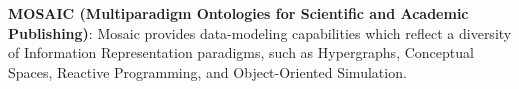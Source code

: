 \begin{frame}{}
{\begin{minipage}{.97\textwidth}
{\begin{enumerate}
\dmitem \textbf{MOSAIC (Multiparadigm Ontologies 
	for Scientific and Academic Publishing)}: \hspace{.25em} 
Mosaic provides data-modeling capabilities which 
reflect a diversity of Information Representation 
paradigms, such as Hypergraphs, Conceptual Spaces, 
Reactive Programming, and Object-Oriented Simulation.  \\
\vspace{12pt}\hspace{11pt}\raisebox{12pt}{\MySquare}\hspace{11pt}\parbox{19cm}{{\color[rgb]{0.3,0,0.1}{Mosaic includes 
the Mosaic/HTXN Semantic Document Infoset (MH-SDI) and 
Mosaic Plugin Framework (MPF) (see slides 27-34).}}}
\vspace{11pt}  

\end{enumerate}
}

\end{minipage}
}


\end{frame}
